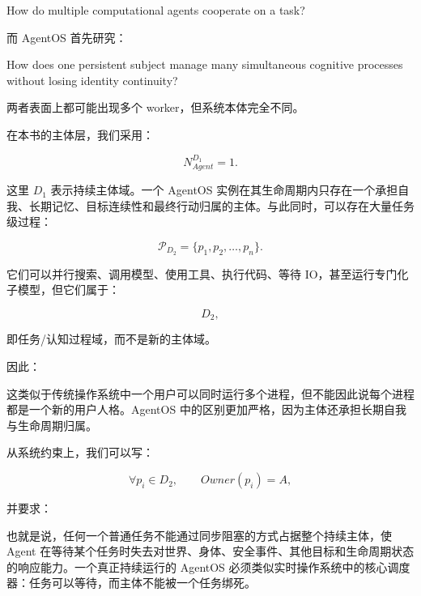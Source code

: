 \begin{statementbox}
How do multiple computational agents cooperate on a task?
\end{statementbox}

而 AgentOS 首先研究：

\begin{statementbox}
How does one persistent subject manage many simultaneous cognitive processes without losing identity continuity?
\end{statementbox}

两者表面上都可能出现多个 worker，但系统本体完全不同。

在本书的主体层，我们采用：

\[
\boxed{
N_{Agent}^{D_1}=1.
}
\]

这里 $D_1$ 表示持续主体域。一个 AgentOS 实例在其生命周期内只存在一个承担自我、长期记忆、目标连续性和最终行动归属的主体。与此同时，可以存在大量任务级过程：

\[
\mathcal{P}_{D_2}
=
\{p_1,p_2,\ldots,p_n\}.
\]

它们可以并行搜索、调用模型、使用工具、执行代码、等待 IO，甚至运行专门化子模型，但它们属于：

\[
D_2,
\]

即任务/认知过程域，而不是新的主体域。

因此：

\begin{statementbox}
\centering
{}
\end{statementbox}

这类似于传统操作系统中一个用户可以同时运行多个进程，但不能因此说每个进程都是一个新的用户人格。AgentOS 中的区别更加严格，因为主体还承担长期自我与生命周期归属。

从系统约束上，我们可以写：

\[
\forall p_i\in D_2,
\qquad
Owner(p_i)=A,
\]

并要求：

\begin{statementbox}
\centering
{}
\end{statementbox}

也就是说，任何一个普通任务不能通过同步阻塞的方式占据整个持续主体，使 Agent 在等待某个任务时失去对世界、身体、安全事件、其他目标和生命周期状态的响应能力。一个真正持续运行的 AgentOS 必须类似实时操作系统中的核心调度器：任务可以等待，而主体不能被一个任务绑死。

